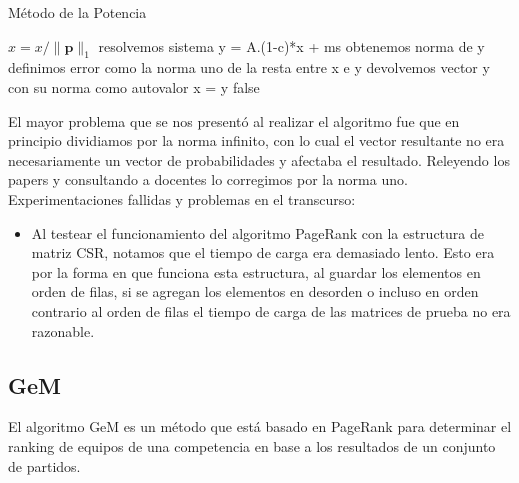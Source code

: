 \begin{algorithm}
\caption{Método de la Potencia}\label{metpot}
\begin{algorithmic}[1]


    \State $x = x/\lVert \mathbf{p} \rVert _{1}$
	    \State resolvemos sistema y = A.(1-c)*x + ms
 	    \State obtenemos norma de y
 	    \State 	definimos error como la norma uno de la resta entre x e y
      	\State devolvemos vector y con su norma como autovalor
      \Else
        \State x = y
      \EndIf
    \EndWhile
    \Return false
  \EndFunction

\end{algorithmic}
\end{algorithm}


El mayor problema que se nos presentó al realizar el algoritmo fue que en principio dividiamos por la norma infinito, con lo cual el vector resultante no era necesariamente un vector de probabilidades y afectaba el resultado. Releyendo los papers y consultando a docentes lo corregimos por la norma uno.\\


Experimentaciones fallidas y problemas en el transcurso:
\begin{itemize}
\item Al testear el funcionamiento del algoritmo PageRank con la estructura de matriz CSR, notamos que el tiempo de carga era demasiado lento. Esto era por la forma en que funciona esta estructura, al guardar los elementos en orden de filas, si se agregan los elementos en desorden o incluso en orden contrario al orden de filas el tiempo de carga de las matrices de prueba no era razonable.
\end{itemize}


\subsection{GeM}

El algoritmo GeM es un método que está basado en PageRank para determinar el ranking de equipos de una competencia en base a los resultados de un conjunto de partidos.

